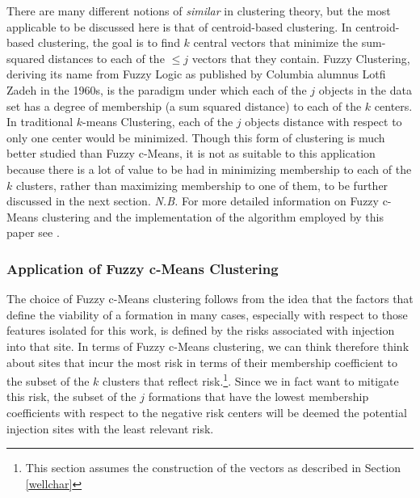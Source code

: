 \documentclass[a4paper, 12pt]{article}
\begin{document}
\par There are many different notions of \emph{similar} in clustering theory, but the most applicable to be discussed here is that of centroid-based clustering. In centroid-based clustering, the goal is to find $k$ central vectors that minimize the sum-squared distances to each of the $\leq j$ vectors that they contain. Fuzzy Clustering, deriving its name from Fuzzy Logic as published by Columbia alumnus Lotfi Zadeh in the 1960s, is the paradigm under which each of the $j$ objects in the data set has a degree of membership (a sum squared distance) to each of the $k$ centers. In traditional $k$-means Clustering, each of the $j$ objects distance with respect to only one center would be minimized. Though this form of clustering is much better studied than Fuzzy c-Means, it is not as suitable to this application because there is a lot of value to be had in minimizing membership to each of the $k$ clusters, rather than maximizing membership to one of them, to be further discussed in the next section.  
\emph{N.B.} For more detailed information on Fuzzy c-Means clustering and the implementation of the algorithm employed by this paper see \cite{cmeanspaper}. 

\subsubsection{Application of Fuzzy c-Means Clustering} 
\par The choice of Fuzzy c-Means clustering follows from the idea that the factors that define the viability of a formation in many cases, especially with respect to those features isolated for this work, is defined by the risks associated with injection into that site. In terms of Fuzzy c-Means clustering, we can think therefore think about sites that incur the most risk in terms of their membership coefficient to the subset of the $k$ clusters that reflect risk.\footnote{This section assumes the construction of the vectors as described in Section \ref{wellchar}}. Since we in fact want to mitigate this risk, the subset of the $j$ formations that have the lowest membership coefficients with respect to the negative risk centers will be deemed the potential injection sites with the least relevant risk.
\end{document}
